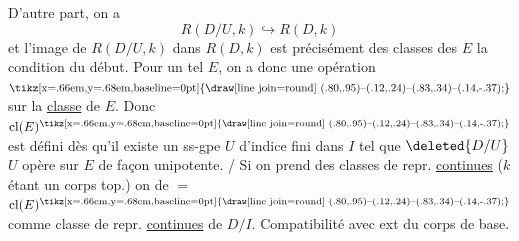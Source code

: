 D'autre part, on a
\[
 R(D/U,k)\hookrightarrow R(D,k)
\]
et l'image de $R(D/U,k)$ dans $R(D,k)$ est précisément  des classes des $E$  la condition du début. Pour un tel $E$, on a donc une opération $\mathord{\text{\tikz[x=.66em,y=.68em,baseline=0pt]{\draw[line join=round] (.80,.95)--(.12,.24)--(.83,.34)--(.14,-.37);}}}$ sur la \uline{classe} de $E$. Donc $\operatorname{cl}(E)^{\mathord{\text{\tikz[x=.66em,y=.68em,baseline=0pt]{\draw[line join=round] (.80,.95)--(.12,.24)--(.83,.34)--(.14,-.37);}}}}$ est défini dès qu'il existe un ss-gpe  $U$ d'indice fini dans $I$ tel que $\deleted{D/U}$ $U$ opère sur $E$ de façon unipotente. / Si on prend des classes de repr. \uline{continues} ($k$ étant un corps top.) on   de $=$ $\operatorname{cl}(E)^{\mathord{\text{\tikz[x=.66em,y=.68em,baseline=0pt]{\draw[line join=round] (.80,.95)--(.12,.24)--(.83,.34)--(.14,-.37);}}}}$ comme classe de repr. \uline{continues} de $D/I$. Compatibilité avec ext du corps de base.

